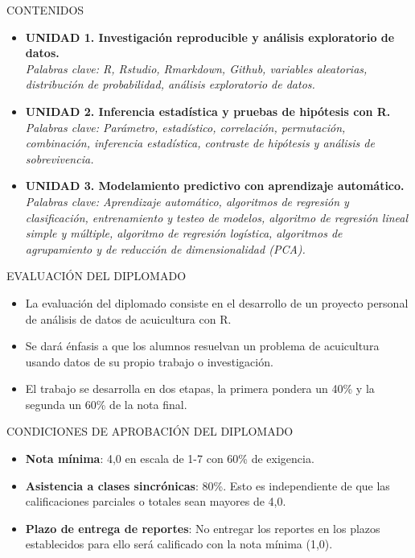 \documentclass[
  ignorenonframetext,
]{beamer}
\begin{document}
\begin{frame}{CONTENIDOS}
\protect\hypertarget{contenidos}{}

\begin{itemize}
\item
  \textbf{UNIDAD 1. Investigación reproducible y análisis exploratorio
  de datos.}\\
  \emph{Palabras clave: R, Rstudio, Rmarkdown, Github, variables
  aleatorias, distribución de probabilidad, análisis exploratorio de
  datos.}
\item
  \textbf{UNIDAD 2. Inferencia estadística y pruebas de hipótesis con
  R.}\\
  \emph{Palabras clave: Parámetro, estadístico, correlación,
  permutación, combinación, inferencia estadística, contraste de
  hipótesis y análisis de sobrevivencia.}
\item
  \textbf{UNIDAD 3. Modelamiento predictivo con aprendizaje automático.
  }\\
  \emph{Palabras clave: Aprendizaje automático, algoritmos de regresión
  y clasificación, entrenamiento y testeo de modelos, algoritmo de
  regresión lineal simple y múltiple, algoritmo de regresión logística,
  algoritmos de agrupamiento y de reducción de dimensionalidad (PCA).}
\end{itemize}

\end{frame}

\begin{frame}{EVALUACIÓN DEL DIPLOMADO}
\protect\hypertarget{evaluaciuxf3n-del-diplomado}{}

\begin{itemize}
\item
  La evaluación del diplomado consiste en el desarrollo de un proyecto
  personal de análisis de datos de acuicultura con R.
\item
  Se dará énfasis a que los alumnos resuelvan un problema de acuicultura
  usando datos de su propio trabajo o investigación.
\item
  El trabajo se desarrolla en dos etapas, la primera pondera un 40\% y
  la segunda un 60\% de la nota final.
\end{itemize}

\end{frame}

\begin{frame}{CONDICIONES DE APROBACIÓN DEL DIPLOMADO}
\protect\hypertarget{condiciones-de-aprobaciuxf3n-del-diplomado}{}

\begin{itemize}
\item
  \textbf{Nota mínima}: 4,0 en escala de 1-7 con 60\% de exigencia.
\item
  \textbf{Asistencia a clases sincrónicas}: 80\%. Esto es independiente
  de que las calificaciones parciales o totales sean mayores de 4,0.
\item
  \textbf{Plazo de entrega de reportes}: No entregar los reportes en los
  plazos establecidos para ello será calificado con la nota mínima
  (1,0).
\end{itemize}

\end{frame}
\end{document}
